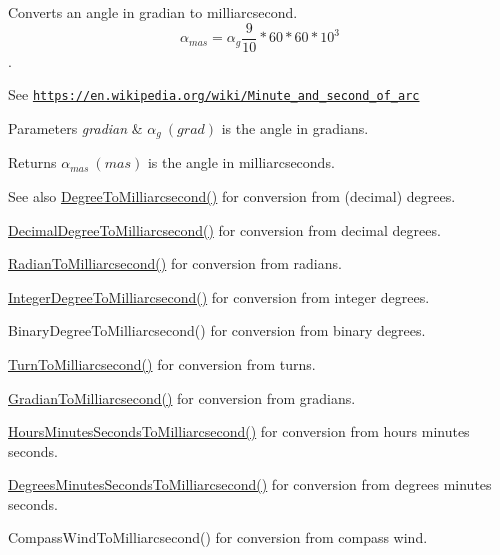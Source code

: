Converts an angle in gradian to milliarcsecond. \[\alpha_{mas}=\alpha_{g}\frac{9}{10} * 60 * 60 * 10^3\]. 

See \href{https://en.wikipedia.org/wiki/Minute_and_second_of_arc}{\tt https\+://en.\+wikipedia.\+org/wiki/\+Minute\+\_\+and\+\_\+second\+\_\+of\+\_\+arc} 
\begin{DoxyParams}{Parameters}
{\em gradian} & $\alpha_{g}\ (grad)$ is the angle in gradians. \\
\hline
\end{DoxyParams}
\begin{DoxyReturn}{Returns}
$\alpha_{mas}\ (mas)$ is the angle in milliarcseconds. 
\end{DoxyReturn}
\begin{DoxySeeAlso}{See also}
\mbox{\hyperlink{group___e_g_x_math-_conversions-_angle_conversions-_degree_ga2c218e286b2ef72a00734dbc5a7f5ab6}{Degree\+To\+Milliarcsecond()}} for conversion from (decimal) degrees. 

\mbox{\hyperlink{group___e_g_x_math-_conversions-_angle_conversions-_decimal_degree_gadb9ff3c92cf7484793f91e7de80c222e}{Decimal\+Degree\+To\+Milliarcsecond()}} for conversion from decimal degrees. 

\mbox{\hyperlink{group___e_g_x_math-_conversions-_angle_conversions-_radian_ga84fbb494a455cfeb30be62776f96c9a9}{Radian\+To\+Milliarcsecond()}} for conversion from radians. 

\mbox{\hyperlink{group___e_g_x_math-_conversions-_angle_conversions-_integer_degree_gadc43f22e832cd8fcf16b7bd2269ae348}{Integer\+Degree\+To\+Milliarcsecond()}} for conversion from integer degrees. 

Binary\+Degree\+To\+Milliarcsecond() for conversion from binary degrees. 

\mbox{\hyperlink{group___e_g_x_math-_conversions-_angle_conversions-_turn_ga05d6fea8f8475831e93dd23f6196393f}{Turn\+To\+Milliarcsecond()}} for conversion from turns. 

\mbox{\hyperlink{group___e_g_x_math-_conversions-_angle_conversions-_gradian_gad77ea0956413029f4166dce8d7f5ce83}{Gradian\+To\+Milliarcsecond()}} for conversion from gradians. 

\mbox{\hyperlink{group___e_g_x_math-_conversions-_angle_conversions-_hours_minutes_seconds_gaf63c3ba5f75aacd268db2814575fa3f9}{Hours\+Minutes\+Seconds\+To\+Milliarcsecond()}} for conversion from hours minutes seconds. 

\mbox{\hyperlink{group___e_g_x_math-_conversions-_angle_conversions-_degrees_minutes_seconds_gafc5f994dfc7cc26500ca978336484926}{Degrees\+Minutes\+Seconds\+To\+Milliarcsecond()}} for conversion from degrees minutes seconds. 

Compass\+Wind\+To\+Milliarcsecond() for conversion from compass wind. 
\end{DoxySeeAlso}
\mbox{\label{group___e_g_x_math-_conversions-_angle_conversions-_gradian_ga144f1019dc760268a163d81fcb3ce482}} 
